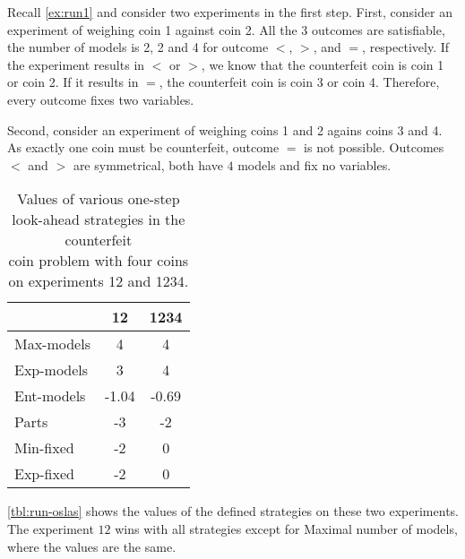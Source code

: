 \begin{example}
Recall \autoref{ex:run1} and consider two experiments in the first step.
First, consider an experiment of weighing coin 1 against coin 2.
All the 3 outcomes are satisfiable, the number of models is
  2, 2 and 4 for outcome $<$, $>$, and $=$, respectively.
If the experiment results in $<$ or $>$, we know that the counterfeit coin
is coin 1 or coin 2. If it results in $=$, the counterfeit coin is coin 3 or coin 4.
Therefore, every outcome fixes two variables.

Second, consider an experiment of weighing coins 1 and 2 agains coins 3 and 4.
As exactly one coin must be counterfeit, outcome $=$ is not possible.
Outcomes $<$ and $>$ are symmetrical, both have $4$ models and fix no variables.

\begin{table}[ht]
\begin{center}
\begin{tabular}{l|cc}
& 12 & 1234 \\\hline
Max-models & 4 & 4 \\
Exp-models & 3 & 4 \\
Ent-models & -1.04 & -0.69 \\
Parts & -3 & -2 \\
Min-fixed & -2 & 0 \\
Exp-fixed & -2 & 0 \\
\end{tabular}
\caption{Values of various one-step look-ahead strategies in the counterfeit \\
  coin problem with four coins on experiments 12 and 1234.}
\label{tbl:run-oslas}
\end{center}
\end{table}

\autoref{tbl:run-oslas} shows the values of the defined
  strategies on these two experiments.
The experiment $12$ wins with all strategies except for Maximal number of models,
  where the values are the same. \eqed
\end{example}




